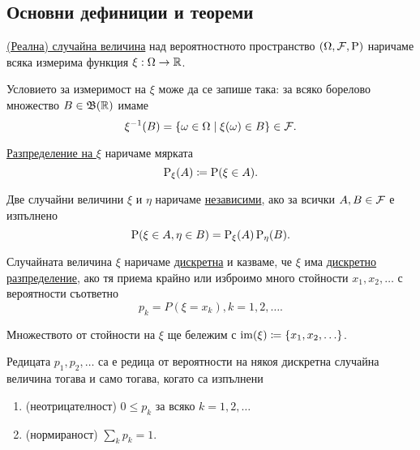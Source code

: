 \documentclass[numbers=endperiod, DIV=15, bibliography=totocnumbered]{scrartcl}
\begin{document}
\subsection{Основни дефиниции и теореми}

\begin{definition}
  \underline{(Реална) случайна величина} над вероятностното пространство $(\Omega, \mathcal{F}, \operatorname{P})$ наричаме всяка измерима функция $\xi : \Omega \to \mathbb{R}$.

  Условието за измеримост на $\xi$ може да се запише така: за всяко борелово множество $B \in \mathfrak{B}(\mathbb{R})$ имаме
  \begin{displaymath}
    \xi^{-1} (B) = \{ \omega \in \Omega \mid \xi(\omega) \in B \} \in \mathcal{F}.
  \end{displaymath}

  \underline{Разпределение на $\xi$} наричаме мярката
  \begin{displaymath}
    \operatorname{P}_\xi(A) \coloneqq \operatorname{P}(\xi \in A).
  \end{displaymath}

  Две случайни величини $\xi$ и $\eta$ наричаме \underline{независими}, ако за всички $A, B \in \mathcal{F}$ е изпълнено
  \begin{displaymath}
    \operatorname{P}(\xi \in A, \eta \in B) = \operatorname{P}_\xi(A) \operatorname{P}_\eta(B).
  \end{displaymath}

  Случайната величина $\xi$ наричаме \underline{дискретна} и казваме, че $\xi$ има \underline{дискретно разпределение}, ако тя приема крайно или изброимо много стойности $x_1, x_2, \ldots$ с вероятности съответно
  \begin{displaymath}
    p_k = P(\xi = x_k), k = 1, 2, \ldots.
  \end{displaymath}

  Множеството от стойности на $\xi$ ще бележим с $\operatorname{im}(\xi) \coloneqq \{ x_1, x_2, \ldots \}$.
\end{definition}

\begin{theorem}\label{thm:rv-iff-pf}
  Редицата $p_1, p_2, \ldots$ са е редица от вероятности на някоя дискретна случайна величина тогава и само тогава, когато са изпълнени
  \begin{enumerate}
    \item\label{thm:rv-iff-pf.bounded} (неотрицателност) $0 \leq p_k$ за всяко $k = 1, 2, \ldots$
    \item\label{thm:rv-iff-pf.normed} (нормираност) $\sum_k p_k = 1$.
  \end{enumerate}
\end{theorem}
\end{document}
